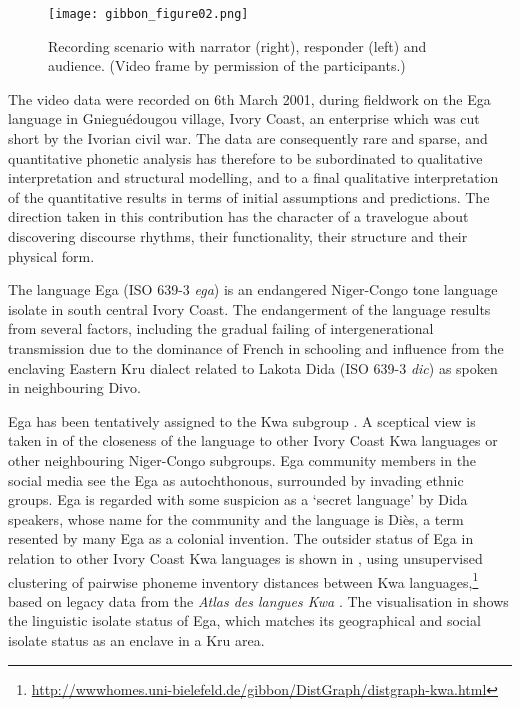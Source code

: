 \documentclass[output=paper,colorlinks,citecolor=brown]{langscibook}
\begin{document}
\begin{figure}
\texttt{[image: gibbon\_figure02.png]}
\caption{\label{fig:fig02}Recording scenario with narrator (right), responder (left) and audience. (Video frame by permission of the participants.)}
\end{figure}

The video data were recorded on 6th March 2001, during fieldwork on the Ega language in Gnieguédougou village, Ivory Coast, an enterprise which was cut short by the Ivorian civil war. The data are consequently rare and sparse, and quantitative phonetic analysis has therefore to be subordinated to qualitative interpretation and structural modelling, and to a final qualitative interpretation of the quantitative results in terms of initial assumptions and predictions. The direction taken in this contribution has the character of a travelogue about discovering discourse rhythms, their functionality, their structure and their physical form.

The language Ega (ISO 639-3 \textit{ega}) is an endangered Niger-Congo tone language isolate in south central Ivory Coast. The endangerment of the language results from several factors, including the gradual failing of intergenerational transmission due to the dominance of French in schooling and influence from the enclaving Eastern Kru dialect related to Lakota Dida (ISO 639-3 \textit{dic}) as spoken in neighbouring Divo.

Ega has been tentatively assigned to the Kwa subgroup \citep{bolerichard1983, connellahouagibbon2002, salffner2004}. A sceptical view is taken in  of the closeness of the language to other Ivory Coast Kwa languages or other neighbouring Niger-Congo subgroups. Ega community members in the social media see the Ega as autochthonous, surrounded by invading ethnic groups. Ega is regarded with some suspicion as a `secret language' by Dida speakers, whose name for the community and the language is Diès, a term resented by many Ega as a colonial invention. The outsider status of Ega in relation to other Ivory Coast Kwa languages is shown in , using unsupervised clustering of pairwise phoneme inventory distances between Kwa languages,\footnote{\url{http://wwwhomes.uni-bielefeld.de/gibbon/DistGraph/distgraph-kwa.html}} based on legacy data from the \textit{Atlas des langues Kwa} \citep{herault1983}. The visualisation in  shows the linguistic isolate status of Ega, which matches its geographical and social isolate status as an enclave in a Kru area.
\end{document}
